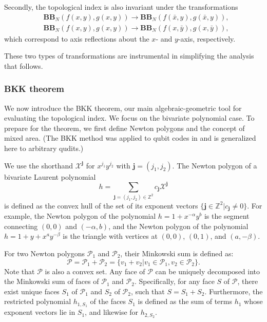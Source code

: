 \documentclass[aps,prb,english,superscriptaddress,twocolumn,tightenlines,showpacs,longbibliography,floatfix,amsfonts]{revtex4-2}
\begin{document}
Secondly, the topological index is also invariant under the transformations
\begin{equation}
    \begin{aligned}
        &\mathbf{BB}_N(f(x,y),g(x,y))\rightarrow\mathbf{BB}_N(f(\bar{x},y),g(\bar{x},y)),\\
        &\mathbf{BB}_N(f(x,y),g(x,y))\rightarrow\mathbf{BB}_N(f(x,\bar{y}),g(x,\bar{y})),\label{eq:reflection}
    \end{aligned}
\end{equation}
which correspond to axis reflections about the $x$- and $y$-axis, respectively. 

These two types of transformations are instrumental in simplifying the analysis that follows.

\subsubsection{BKK theorem}
We now introduce the BKK theorem, our main algebraic-geometric tool for evaluating the topological index. We focus on the bivariate polynomial case. To prepare for the theorem, we first define Newton polygons and the concept of mixed area. (The BKK method was applied to qubit codes in \cite{Chen2025} and is generalized here to arbitrary qudits.)

We use the shorthand $\mathcal{X}^{\mathbf{j}}$ for $x^{j_1}y^{j_2}$ with $\mathbf{j}=(j_1,j_2)$. The Newton polygon of a bivariate Laurent polynomial 
\begin{equation}
    h=\sum_{\mathbf{j}=(j_1,j_2)\in\mathbb{Z}^2}c_{\mathbf{j}}\mathcal{X}^{\mathbf{j}}
\end{equation}
is defined as the convex hull of the set of its exponent vectors $\{\mathbf{j}\in\mathbb{Z}^2|c_{\mathbf{j}}\neq 0\}$. For example, the Newton polygon of the polynomial $h=1+x^{-\alpha}y^{b}$ is the segment connecting $(0,0)$ and $(-\alpha,b)$, and the Newton polygon of the polynomial $h=1+y+x^{a}y^{-\beta}$ is the triangle with vertices at $(0,0)$, $(0,1)$, and $(a,-\beta)$.
  
For two Newton polygons $\mathscr{P}_1$ and $\mathscr{P}_2$, their Minkowski sum is defined as:
\begin{equation}
    \mathscr{P}=\mathscr{P}_1+\mathscr{P}_2=\{v_1+v_2|v_1\in\mathscr{P}_1,v_2\in\mathscr{P}_2\}.
\end{equation}
Note that $\mathscr{P}$ is also a convex set. Any face of $\mathscr{P}$ can be uniquely decomposed into the  Minkowski sum of faces of $\mathscr{P}_1$ and $\mathscr{P}_2$. Specifically, for any face $S$ of $\mathscr{P}$, there exist unique faces $S_1$ of $\mathscr{P}_1$ and $S_2$ of $\mathscr{P}_2$, such that $S=S_1+S_2$. Furthermore, the restricted polynomial $h_{1, S_1}$ of the faces $S_1$ is defined as the sum of terms $h_1$ whose exponent vectors lie in $S_1$, and likewise for $h_{2, S_2}$.
  
\end{document}
